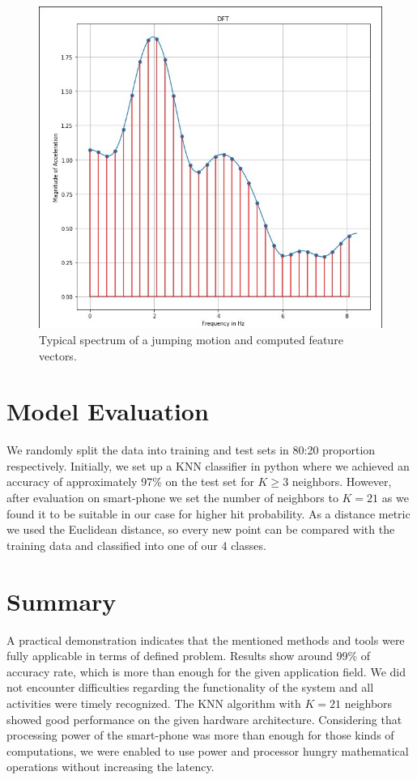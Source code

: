\documentclass[conference]{IEEEtran}
\begin{document}
\begin{figure}[!htp]
\begin{center}
\includegraphics[width=0.9\linewidth]{fig/dft}
\caption{Typical spectrum of a jumping motion and computed feature vectors.}\label{fig:dft}
\end{center}
\end{figure}

\section{Model Evaluation}
\label{sec:model}


We randomly split the data into training and test sets in
80:20 proportion respectively. Initially, we set up a KNN classifier in python where we achieved an accuracy of approximately 97\% on the test set for $K \geq 3$ neighbors. However, after evaluation on smart-phone we set the number of neighbors to $K = 21$ as we found it to be suitable in our case for higher hit probability. As a distance metric we used the Euclidean
distance, so every new point can be compared with the training data and classified into one of our 4 classes.


\section{Summary}
\label{sec:summary}

A practical demonstration indicates that the mentioned methods and tools were fully applicable in terms of defined problem. Results show around 99\% of accuracy rate, which is more than enough for the given application field. We did not encounter difficulties regarding the functionality of the system and all activities were timely recognized. The KNN algorithm with $K = 21$ neighbors showed good performance on the given hardware architecture. Considering that processing power of the smart-phone was more
than enough for those kinds of computations, we were enabled to use power and processor hungry mathematical operations without increasing the latency.
\end{document}
